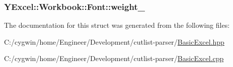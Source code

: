 \subsubsection[{weight\+\_\+}]{ Y\+Excel\+::\+Workbook\+::\+Font\+::weight\+\_\+}\label{struct_y_excel_1_1_workbook_1_1_font_ab3edd2cca8e2827ecf63385d1404bf7c}


The documentation for this struct was generated from the following files\+:\begin{DoxyCompactItemize}
\item 
C\+:/cygwin/home/\+Engineer/\+Development/cutlist-\/parser/\hyperlink{_basic_excel_8hpp}{Basic\+Excel.\+hpp}\item 
C\+:/cygwin/home/\+Engineer/\+Development/cutlist-\/parser/\hyperlink{_basic_excel_8cpp}{Basic\+Excel.\+cpp}\end{DoxyCompactItemize}
